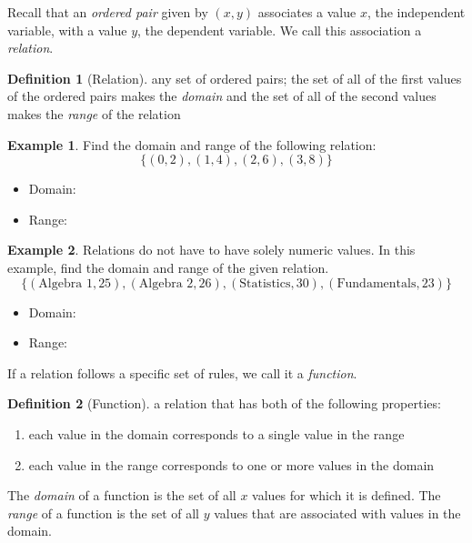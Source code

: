 \documentclass[addpoints,12pt]{exam}
\theoremstyle{definition}
\newtheorem{example}{Example}[subsection]
\newtheorem{definition}{Definition}[subsection]
\begin{document}
\setcounter{section}{8}
\setcounter{subsection}{1}

Recall that an \emph{ordered pair} given by $(x,y)$ associates a value $x$, the independent variable, with a value $y$, the dependent variable. We call this association a \emph{relation}.
\vspace{.2in}
\begin{definition}[Relation]
any set of ordered pairs; the set of all of the first values of the ordered pairs makes the \emph{domain} and the set of all of the second values makes the \emph{range} of the relation
\end{definition}

\begin{example}
Find the domain and range of the following relation:
\[\{(0,2),(1,4),(2,6),(3,8)\}\]
\begin{itemize}
\item Domain: 
\vspace{.5in}
\item Range:
\vspace{.5in}
\end{itemize}
\end{example}

\begin{example}
Relations do not have to have solely numeric values. In this example, find the domain and range of the given relation.
\[\{(\text{Algebra 1},25),(\text{Algebra 2},26),(\text{Statistics},30),(\text{Fundamentals},23)\}\]
\begin{itemize}
\item Domain: 
\vspace{.5in}
\item Range:
\vspace{.5in}
\end{itemize}
\end{example}

If a relation follows a specific set of rules, we call it a \emph{function}.

\begin{definition}[Function]
a relation that has both of the following properties:
\begin{enumerate}
\item each value in the domain corresponds to a single value in the range
\item each value in the range corresponds to one or more values in the domain
\end{enumerate}

The \emph{domain} of a function is the set of all $x$ values for which it is defined. The \emph{range} of a function is the set of all $y$ values that are associated with values in the domain.
\end{definition}
\end{document}
